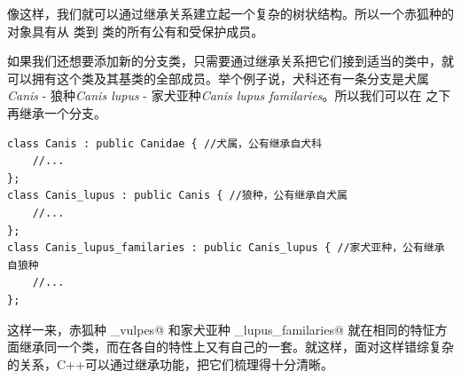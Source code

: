 像这样，我们就可以通过继承关系建立起一个复杂的树状结构。所以一个赤狐种的对象具有从 \lstinline@Eukarya@ 类到 \lstinline@Vulpes@ 类的所有公有和受保护成员。\par
如果我们还想要添加新的分支类，只需要通过继承关系把它们接到适当的类中，就可以拥有这个类及其基类的全部成员。举个例子说，犬科还有一条分支是犬属\textit{Canis} - 狼种\textit{Canis lupus} - 家犬亚种\textit{Canis lupus familaries}。所以我们可以在 \lstinline@Canidae@ 之下再继承一个分支。
\begin{lstlisting}
class Canis : public Canidae { //犬属，公有继承自犬科
    //...
};
class Canis_lupus : public Canis { //狼种，公有继承自犬属
    //...
};
class Canis_lupus_familaries : public Canis_lupus { //家犬亚种，公有继承自狼种
    //...
};
\end{lstlisting}\par
这样一来，赤狐种 \lstinline@Vulpes_vulpes@ 和家犬亚种 \lstinline@Canis_lupus_familaries@ 就在相同的特怔方面继承同一个类，而在各自的特性上又有自己的一套。就这样，面对这样错综复杂的关系，C++可以通过继承功能，把它们梳理得十分清晰。\par

